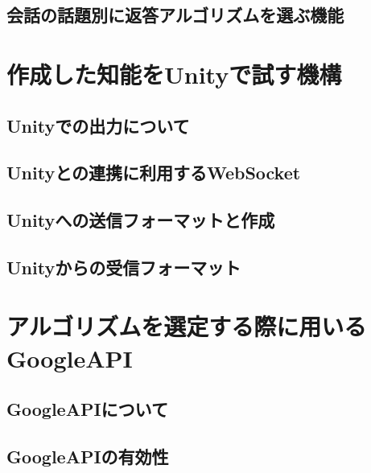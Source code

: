 \subsection{会話の話題別に返答アルゴリズムを選ぶ機能}

\section{作成した知能をUnityで試す機構}
\subsection{Unityでの出力について}
\subsection{Unityとの連携に利用するWebSocket}
\subsection{Unityへの送信フォーマットと作成}
\subsection{Unityからの受信フォーマット}

\section{アルゴリズムを選定する際に用いるGoogleAPI}
\subsection{GoogleAPIについて}
\subsection{GoogleAPIの有効性}

